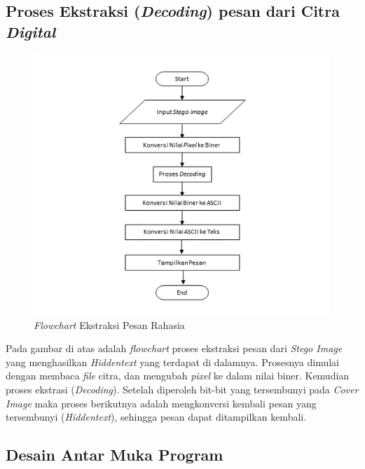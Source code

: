 	\subsection{Proses Ekstraksi (\emph{Decoding}) pesan dari Citra \emph{Digital}}
	
	\begin{figure}[H]
		\centering
		\includegraphics[width=1\textwidth]{gambar/ekstraksi3}
		\caption{\emph{Flowchart} Ekstraksi Pesan Rahasia}
		\label{flowchart_ekstraksi}
	\end{figure}

	Pada gambar di atas adalah \emph{flowchart} proses ekstraksi pesan dari \emph{Stego Image} yang menghasilkan \emph{Hiddentext} yang terdapat di dalamnya. Prosesnya dimulai dengan
	membaca \emph{file} citra, dan mengubah \emph{pixel} ke dalam nilai biner.
	Kemudian proses ekstrasi (\emph{Decoding}). Setelah diperoleh bit-bit yang tersembunyi pada \emph{Cover Image} maka proses
	berikutnya adalah mengkonversi kembali pesan yang tersembunyi (\emph{Hiddentext}), sehingga pesan dapat ditampilkan kembali.

	\subsection{Desain Antar Muka Program}

